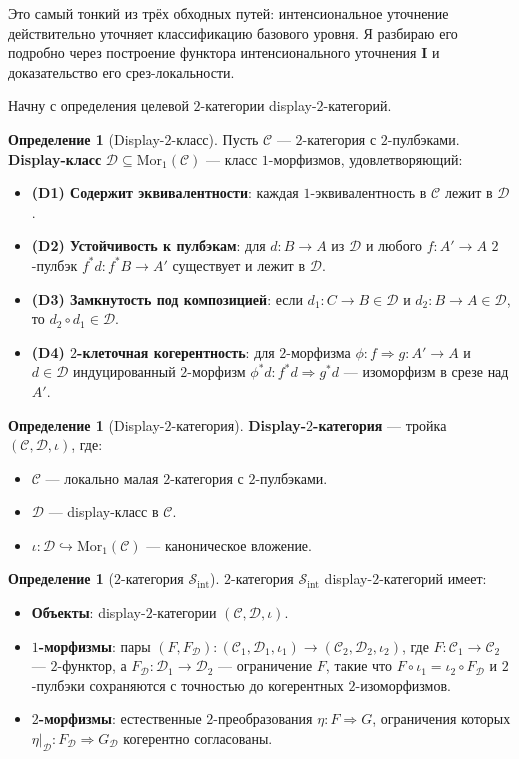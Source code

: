 \documentclass[11pt]{article}
\theoremstyle{plain}
\theoremstyle{definition}
\newtheorem{definition}[theorem]{Определение}
\newcommand{\cS}{\mathcal{S}}
\newcommand{\cC}{\mathcal{C}}
\newcommand{\cD}{\mathcal{D}}
\newcommand{\Sint}{\cS_{\mathrm{int}}}
\newcommand{\Mor}{\mathrm{Mor}}
\newcommand{\II}{\mathbf{I}}
\begin{document}
Это самый тонкий из трёх обходных путей: интенсиональное уточнение действительно уточняет классификацию базового уровня. Я разбираю его подробно через построение функтора интенсионального уточнения $\II$ и доказательство его срез-локальности.

Начну с определения целевой $2$-категории display-$2$-категорий.

\begin{definition}[Display-$2$-класс]\label{def:display-class}
Пусть $\cC$ — $2$-категория с $2$-пулбэками. \textbf{Display-класс} $\cD \subseteq \Mor_1(\cC)$ — класс $1$-морфизмов, удовлетворяющий:
\begin{itemize}
\item \textbf{(D1) Содержит эквивалентности}: каждая $1$-эквивалентность в $\cC$ лежит в $\cD$.
\item \textbf{(D2) Устойчивость к пулбэкам}: для $d : B \to A$ из $\cD$ и любого $f : A' \to A$ $2$-пулбэк $f^*d : f^*B \to A'$ существует и лежит в $\cD$.
\item \textbf{(D3) Замкнутость под композицией}: если $d_1 : C \to B \in \cD$ и $d_2 : B \to A \in \cD$, то $d_2 \circ d_1 \in \cD$.
\item \textbf{(D4) $2$-клеточная когерентность}: для $2$-морфизма $\phi : f \Rightarrow g : A' \to A$ и $d \in \cD$ индуцированный $2$-морфизм $\phi^* d : f^* d \Rightarrow g^* d$ — изоморфизм в срезе над $A'$.
\end{itemize}
\end{definition}

\begin{definition}[Display-$2$-категория]\label{def:display-2-cat}
\textbf{Display-$2$-категория} — тройка $(\cC, \cD, \iota)$, где:
\begin{itemize}
\item $\cC$ — локально малая $2$-категория с $2$-пулбэками.
\item $\cD$ — display-класс в $\cC$.
\item $\iota : \cD \hookrightarrow \Mor_1(\cC)$ — каноническое вложение.
\end{itemize}
\end{definition}

\begin{definition}[$2$-категория $\Sint$]\label{def:Sint}
$2$-категория $\Sint$ display-$2$-категорий имеет:
\begin{itemize}
\item \textbf{Объекты}: display-$2$-категории $(\cC, \cD, \iota)$.
\item \textbf{$1$-морфизмы}: пары $(F, F_\cD) : (\cC_1, \cD_1, \iota_1) \to (\cC_2, \cD_2, \iota_2)$, где $F : \cC_1 \to \cC_2$ — $2$-функтор, а $F_\cD : \cD_1 \to \cD_2$ — ограничение $F$, такие что $F \circ \iota_1 = \iota_2 \circ F_\cD$ и $2$-пулбэки сохраняются с точностью до когерентных $2$-изоморфизмов.
\item \textbf{$2$-морфизмы}: естественные $2$-преобразования $\eta : F \Rightarrow G$, ограничения которых $\eta|_\cD : F_\cD \Rightarrow G_\cD$ когерентно согласованы.
\end{itemize}
\end{definition}
\end{document}
